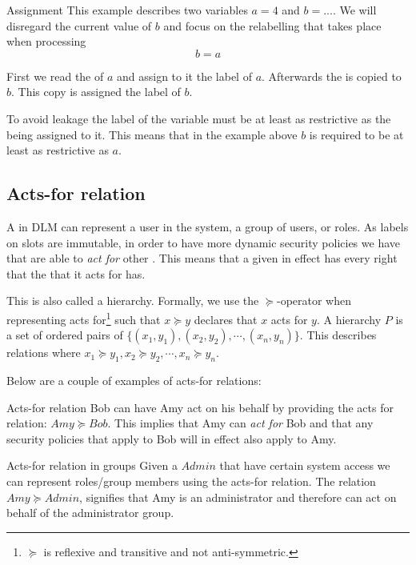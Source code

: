 \begin{example}{Assignment}
  This example describes two variables $a = 4$ and $b = ...$.
  We will disregard the current value of $b$ and focus on the relabelling that takes place when processing $$b = a$$

  First we read the \xvalue{} of $a$ and assign to it the label of $a$.
  Afterwards the \xvalue{} is copied to $b$.
  This copy is assigned the label of $b$.
\end{example}

To avoid leakage the label of the variable must be at least as restrictive as the \xvalue{} being assigned to it.
This means that in the example above $b$ is required to be at least as restrictive as $a$.

\subsection{Acts-for relation}
A \principal{} in DLM can represent a user in the system, a group of users, or roles.
As labels on slots are immutable, in order to have more dynamic security policies we have that \principals{} are able to \textit{act for} other \principals{}.
This means that a given \principal{} in effect has every right that the \principal{} that it acts for has.

This is also called a \principal{} hierarchy.
Formally, we use the $\succeq$-operator when representing acts for\footnote{$\succeq$ is reflexive and transitive and not anti-symmetric.} such that $x \succeq y$ declares that $x$ acts for $y$.
A \principal{} hierarchy $P$ is a set of ordered pairs of \principals{} $\{(x_1, y_1), (x_2, y_2), \cdots, (x_n, y_n)\}$.
This describes relations where $x_1 \succeq y_1, x_2 \succeq y_2, \cdots, x_n \succeq y_n$.

Below are a couple of examples of acts-for relations:
\begin{example}{Acts-for relation}
  Bob can have Amy act on his behalf by providing the acts for relation: $Amy \succeq Bob$.
  This implies that Amy can \textit{act for} Bob and that any security policies that apply to Bob will in effect also apply to Amy.
\end{example}

\begin{example}{Acts-for relation in groups}
  Given a \principal{} $Admin$ that have certain system access we can represent roles/group members using the acts-for relation.
  The relation $Amy \succeq Admin$, signifies that Amy is an administrator and therefore can act on behalf of the administrator group. 
\end{example}

